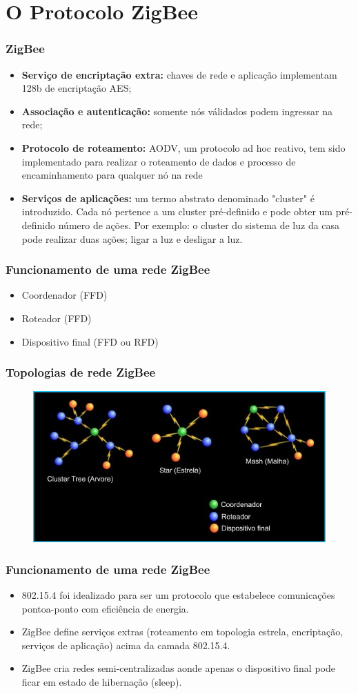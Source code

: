 \documentclass{beamer}
\begin{document}
  \section{O Protocolo ZigBee}
  \frame
  {
    \frametitle{ZigBee}
    \begin{itemize}
      \item \textbf{Serviço de encriptação extra:} chaves de rede e aplicação implementam 128b de encriptação AES;
      \item \textbf{Associação e autenticação:} somente nós válidados podem ingressar na rede;
      \item \textbf{Protocolo de roteamento:} AODV, um protocolo ad hoc reativo, tem sido implementado para realizar o roteamento de dados e processo 
	    de encaminhamento para qualquer nó na rede
      \item \textbf{Serviços de aplicações:} um termo abstrato denominado "cluster" é introduzido. Cada nó pertence a um cluster pré-definido e pode 
	    obter um pré-definido número de ações. Por exemplo: o cluster do sistema de luz da casa pode realizar duas ações; ligar a luz e desligar a luz.
    \end{itemize}
  }
  
  \frame
  {
    \frametitle{Funcionamento de uma rede ZigBee}
    \begin{itemize}
      \item Coordenador (FFD)
      \item Roteador (FFD)
      \item Dispositivo final (FFD ou RFD)
    \end{itemize}
  }

    \frame
  {
    \frametitle{Topologias de rede ZigBee}
    \begin{figure}[ht!]
	  \centering
	  \includegraphics[width=.8\textwidth]{figuras/TopologiaZigBee}
	  \label{fig:topologias}
    \end{figure}
  }
  
    \frame
  {
    \frametitle{Funcionamento de uma rede ZigBee}
    \begin{itemize}
      \item 802.15.4 foi idealizado para ser um protocolo que estabelece comunicações pontoa-ponto com eficiência de energia.
      \item ZigBee define serviços extras (roteamento em topologia estrela, encriptação, serviços de aplicação) acima da camada 802.15.4.
      \item ZigBee cria redes semi-centralizadas aonde apenas o dispositivo final pode ficar em estado de hibernação (sleep).
    \end{itemize}
  }
  
\end{document}
